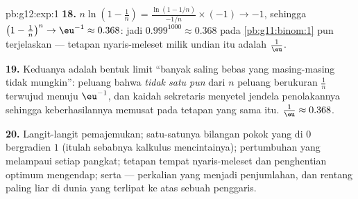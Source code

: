 \begin{solution}{pb:g12:exp:1}
\textbf{18.} $n \ln\!\left(1 - \frac1n\right) =
\frac{\ln(1 - 1/n)}{-1/n} \times (-1) \to -1$, sehingga
$\left(1 - \frac1n\right)^n \to \eu^{-1} \approx 0.368$: jadi
$0.999^{1000} \approx 0.368$ pada \cref{pb:g11:binom:1} pun
terjelaskan --- tetapan nyaris-meleset milik undian itu adalah
$\frac1\eu$.

\textbf{19.} Keduanya adalah bentuk limit ``banyak  saling
bebas yang masing-masing tidak mungkin'': peluang bahwa
\emph{tidak satu pun} dari $n$ peluang berukuran $\frac1n$ terwujud menuju
$\eu^{-1}$, dan kaidah sekretaris menyetel jendela penolakannya
sehingga keberhasilannya memusat pada tetapan yang sama itu.
$\frac1\eu \approx 0.368$.

\textbf{20.} Langit-langit pemajemukan; satu-satunya bilangan pokok yang
 di $0$ bergradien $1$ (itulah sebabnya kalkulus mencintainya);
pertumbuhan yang melampaui setiap pangkat; tetapan tempat
nyaris-meleset dan penghentian optimum mengendap; serta  ---
perkalian yang menjadi penjumlahan, dan rentang paling liar di dunia
yang terlipat ke atas sebuah penggaris.

\end{solution}
